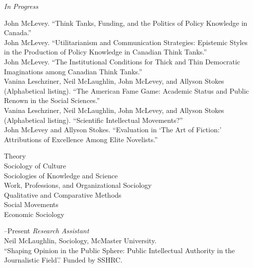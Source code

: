 \documentclass[11pt,usenames,dvipsnames]{article}
\begin{document}
\noindent\emph{In Progress \vspace{0.01in}}

\ind John McLevey. ``Think Tanks, Funding, and the Politics of Policy Knowledge in Canada.''\\

\ind John McLevey. ``Utilitarianism and Communication Strategies: Epistemic Styles in the Production of Policy Knowledge in Canadian Think Tanks.''\\

\ind John McLevey. ``The Institutional Conditions for Thick and Thin Democratic Imaginations among Canadian Think Tanks.''\\

\ind Vanina Leschziner, Neil McLaughlin, John McLevey, and Allyson Stokes (Alphabetical listing). ``The American Fame Game: Academic Status and Public Renown in the Social Sciences.''\\

\ind Vanina Leschziner, Neil McLaughlin, John McLevey, and Allyson Stokes (Alphabetical listing). ``Scientific Intellectual Movements?''\\

\ind John McLevey and Allyson Stokes. ``Evaluation in `The Art of Fiction:' Attributions of Excellence Among Elite Novelists.''\\



\noindent Theory\\
Sociology of Culture\\
Sociologies of Knowledge and Science\\
Work, Professions, and Organizational Sociology\\ 
Qualitative and Comparative Methods\\ 
Social Movements\\
Economic Sociology\\



–Present {\it Research Assistant}\\
Neil McLaughlin, Sociology, McMaster University.\\ 
``Shaping Opinion in the Public Sphere: Public Intellectual Authority in the Journalistic Field'.' Funded by SSHRC.\\
\end{document}

